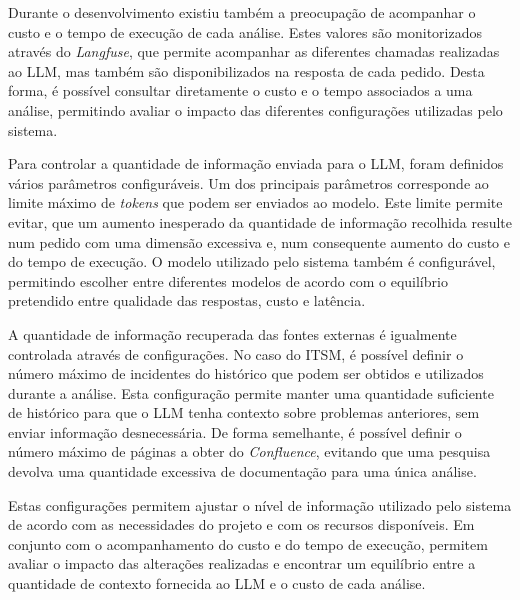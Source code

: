 			

			Durante o desenvolvimento existiu também a preocupação de acompanhar o custo e o tempo de execução de cada análise. Estes valores são monitorizados através do \textit{Langfuse}, que permite acompanhar as diferentes chamadas realizadas ao \gls{LLM}, mas também são disponibilizados na resposta de cada pedido. Desta forma, é possível consultar diretamente o custo e o tempo associados a uma análise, permitindo avaliar o impacto das diferentes configurações utilizadas pelo sistema.
			
			Para controlar a quantidade de informação enviada para o \gls{LLM}, foram definidos vários parâmetros configuráveis. Um dos principais parâmetros corresponde ao limite máximo de \textit{tokens} que podem ser enviados ao modelo. Este limite permite evitar, que um aumento inesperado da quantidade de informação recolhida resulte num pedido com uma dimensão excessiva e, num consequente aumento do custo e do tempo de execução. O modelo utilizado pelo sistema também é configurável, permitindo escolher entre diferentes modelos de acordo com o equilíbrio pretendido entre qualidade das respostas, custo e latência.
			
			A quantidade de informação recuperada das fontes externas é igualmente controlada através de configurações. No caso do \gls{ITSM}, é possível definir o número máximo de incidentes do histórico que podem ser obtidos e utilizados durante a análise. Esta configuração permite manter uma quantidade suficiente de histórico para que o \gls{LLM} tenha contexto sobre problemas anteriores, sem enviar informação desnecessária. De forma semelhante, é possível definir o número máximo de páginas a obter do \textit{Confluence}, evitando que uma pesquisa devolva uma quantidade excessiva de documentação para uma única análise.
			
			Estas configurações permitem ajustar o nível de informação utilizado pelo sistema de acordo com as necessidades do projeto e com os recursos disponíveis. Em conjunto com o acompanhamento do custo e do tempo de execução, permitem avaliar o impacto das alterações realizadas e encontrar um equilíbrio entre a quantidade de contexto fornecida ao \gls{LLM} e o custo de cada análise.
			
